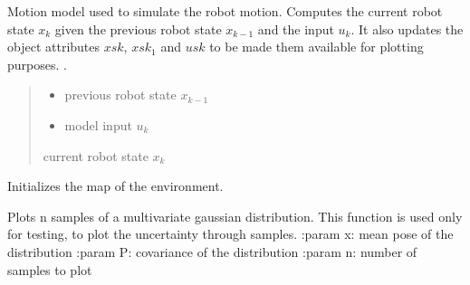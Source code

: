 \documentclass[letterpaper,10pt,english]{sphinxmanual}
\begin{document}
\begin{fulllineitems}
\begin{fulllineitems}
\label{\detokenize{robot_simulation:SimulatedRobot.SimulatedRobot.fs}}
\pysigstartsignatures
{}
\pysigstopsignatures
\sphinxAtStartPar
Motion model used to simulate the robot motion. Computes the current robot state \(x_k\) given the previous robot state \(x_{k-1}\) and the input \(u_k\).
It also updates the object attributes \(xsk\), \(xsk_1\) and  \(usk\) to be made them available for plotting purposes.
.
\begin{quote}\begin{description}
\begin{itemize}
\item {} 
\sphinxAtStartPar
{} \textendash{} previous robot state \(x_{k-1}\)

\item {} 
\sphinxAtStartPar
{} \textendash{} model input \(u_k\)

\end{itemize}

\sphinxAtStartPar
current robot state \(x_k\)

\end{description}\end{quote}

\end{fulllineitems}


\begin{fulllineitems}
\label{\detokenize{robot_simulation:SimulatedRobot.SimulatedRobot.SetMap}}
\pysigstartsignatures
{}
\pysigstopsignatures
\sphinxAtStartPar
Initializes the map of the environment.

\end{fulllineitems}


\begin{fulllineitems}
\label{\detokenize{robot_simulation:SimulatedRobot.SimulatedRobot._PlotSample}}
\pysigstartsignatures
{}
\pysigstopsignatures
\sphinxAtStartPar
Plots n samples of a multivariate gaussian distribution. This function is used only for testing, to plot the
uncertainty through samples.
:param x: mean pose of the distribution
:param P: covariance of the distribution
:param n: number of samples to plot


\end{fulllineitems}
\end{fulllineitems}
\end{document}
